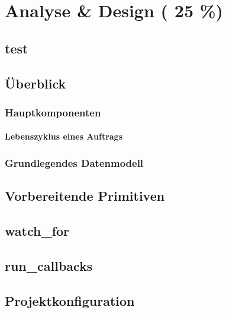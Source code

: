 \chapter{Analyse \& Design ( 25 \%)}


\section{test}







\section{\"Uberblick}
\subsection{Hauptkomponenten}

\subsubsection{Lebenszyklus eines Auftrags}



\subsection{Grundlegendes Datenmodell}

\section{Vorbereitende Primitiven}
\section{watch\_for}
\section{run\_callbacks}

\section{Projektkonfiguration}

